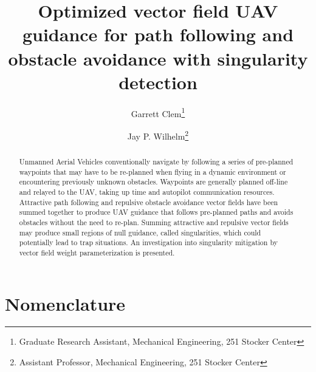 \documentclass[conf]{new-aiaa}
\title{Optimized vector field UAV guidance for path following and obstacle avoidance with singularity detection}
\author{Garrett Clem\footnote{Graduate Research Assistant, Mechanical Engineering, 251 Stocker Center}}
\author{Jay P. Wilhelm\footnote{Assistant Professor, Mechanical Engineering, 251 Stocker Center}}
\affil{Ohio University, Russ College of Engineering and Technology, Athens, OH, 45701}
\begin{document}
\maketitle

\begin{abstract}



Unmanned Aerial Vehicles conventionally navigate by following a series of pre-planned waypoints that may have to be re-planned when flying in a dynamic environment or encountering previously unknown obstacles. Waypoints are generally planned off-line and relayed to the UAV, taking up time and autopilot communication resources. Attractive path following and repulsive obstacle avoidance vector fields have been summed together to produce UAV guidance that follows pre-planned paths and avoids obstacles without the need to re-plan. Summing attractive and repulsive vector fields may produce small regions of null guidance, called singularities, which could potentially lead to trap situations. An investigation into singularity mitigation by vector field weight parameterization is presented. 


\end{abstract}



\section{Nomenclature}
\end{document}
